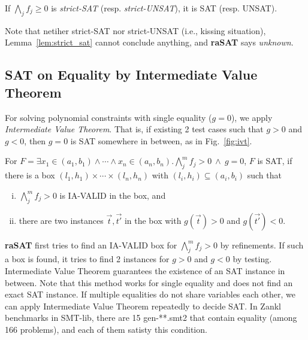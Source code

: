 \documentclass[runningheads,a4paper,oribibl]{llncs}
\begin{document}
\begin{lemma} \label{lem:strict_sat}
If $\bigwedge \limits_{j} f_j \geq 0$ is {\em strict-SAT} (resp. {\em strict-UNSAT}), 
it is SAT (resp. UNSAT).
\end{lemma}

Note that netiher strict-SAT nor strict-UNSAT (i.e., kissing situation), 
Lemma~\ref{lem:strict_sat} cannot conclude anything, and \textbf{raSAT} says {\em unknown}. 


\subsection{SAT on Equality by Intermediate Value Theorem} \label{sec:eq}
For solving polynomial constraints with single equality ($g=0$), we apply {\em Intermediate Value Theorem}. 
That is, if existing 2 test cases such that $g > 0$ and $g < 0$, then $g=0$ is SAT somewhere in between, 
as in Fig.~\ref{fig:ivt}. 

\begin{lemma} \label{lemma:ivt}
For $F = \exists x_1 \in (a_1,b_1) \wedge \cdots \wedge x_n \in (a_n,b_n). 
\bigwedge \limits_{j}^m f_j > 0~\wedge~g = 0$, $F$ is SAT, if 
there is a box $(l_1, h_1) \times \cdots \times (l_n,h_n)$ with $ (l_i,h_i) \subseteq (a_i,b_i)$ 
such that 
\begin{enumerate}[(i)]
\item $\bigwedge \limits_{j}^m f_j > 0$ is IA-VALID in the box, and 
\item there are two instances $\vec{t},\vec{t'}$ in the box with $g(\vec{t}) > 0$ and $g(\vec{t'}) < 0$.
\end{enumerate}
\end{lemma}

{\bf raSAT} first tries to find an IA-VALID box for $\bigwedge \limits_{j}^m f_j > 0$ by refinements. 
If such a box is found, it tries to find 2 instances for $g > 0$ and $g < 0$ by testing. 
Intermediate Value Theorem guarantees the existence of an SAT instance in between. 
Note that this method works for single equality and does not find an exact SAT instance. 
If multiple equalities do not share variables each other, we can apply Intermediate Value Theorem 
repeatedly to decide SAT. In Zankl benchmarks in SMT-lib, there are 15 gen-**.smt2 that contain equality
(among 166 problems), and each of them satisty this condition. 
\end{document}
